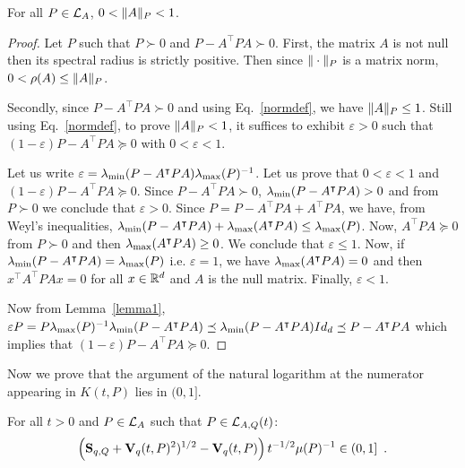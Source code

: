 \documentclass[10pt]{article}
\begin{document}
\begin{lemma}
\label{lyapnorm}
For all $P\in\mathcal{L}_{A}$, $0<\| A\|_P<1$. 
\end{lemma}

\begin{proof}
Let $P$ such that $P\succ 0$ and $P-A^\intercal P A\succ 0$.  First, the matrix $A$ is not null then its spectral radius is strictly positive. Then since $\| \cdot\|_P$ is a matrix norm, $0<\rho(A) \leq \| A\|_P$.

Secondly, since $P-A^\intercal P A\succ 0$ and using Eq.~\eqref{normdef}, we have $\| A\|_P\leq 1$. Still using Eq.~\eqref{normdef}, to prove $\| A\|_P<1$, it suffices to exhibit $\varepsilon>0$ such that $(1-\varepsilon) P-A^\intercal P A\succeq 0$ with $0<\varepsilon<1$. 

Let us write $\varepsilon=\lambda_{\operatorname{min}}(P-A^\intercal P A) \lambda_{\operatorname{max}}(P)^{-1}$. Let us prove that $0<\varepsilon<1$ and $(1-\varepsilon) P-A^\intercal P A\succeq 0$.  Since $P-A^\intercal P A\succ 0$, $\lambda_{\operatorname{min}}(P-A^\intercal P A)>0$ and from $P\succ 0$ we conclude that $\varepsilon >0$. Since $P=P-A^ \intercal P A +A^\intercal P A$, we have, from Weyl's inequalities, $\lambda_{\operatorname{min}}(P-A^\intercal P A)+\lambda_{\operatorname{max}}(A^\intercal P A)\leq \lambda_{\operatorname{max}}(P)$. Now, $A^\intercal P A\succeq 0$ from $P\succ 0$ and then $\lambda_{\operatorname{max}}(A^\intercal P A)\geq 0$. We conclude that $\varepsilon\leq 1$. Now, if $\lambda_{\operatorname{min}}(P-A^\intercal P A)=\lambda_{\operatorname{max}}(P)$ i.e. $\varepsilon=1$, we have 
$\lambda_{\operatorname{max}}(A^\intercal P A)=0$ and then $x^\intercal A^\intercal P A x=0$ for all $x\in \mathbb R^d$ and $A$ is the null matrix. 
Finally, $\varepsilon<1$. 

Now from Lemma~\ref{lemma1}, $\varepsilon P=P\lambda_{\operatorname{max}}(P)^{-1}\lambda_{\operatorname{min}}(P-A^\intercal P A)\preceq \lambda_{\operatorname{min}}(P-A^\intercal P A)Id_d\preceq 
P-A^\intercal P A$ which implies that $(1-\varepsilon) P -A^\intercal P A\succeq 0$. 
\end{proof}

Now we prove that the argument of the natural logarithm at the numerator appearing in $K(t,P)$ lies in $(0,1]$. 

\begin{lemma}
For all $t>0$ and $P\in\mathcal{L}_{A}$ such that $P\in\mathcal{L}_{A,Q}(t)$: \[
\left(\mathbf{S}_{q,Q}+\mathbf{V}_{q}(t,P)^2)^{1/2}-\mathbf{V}_{q}(t,P)\right) t^{-1/2}\mu(P)^{-1}\in (0,1]\enspace .
\]
\end{lemma}
\end{document}
